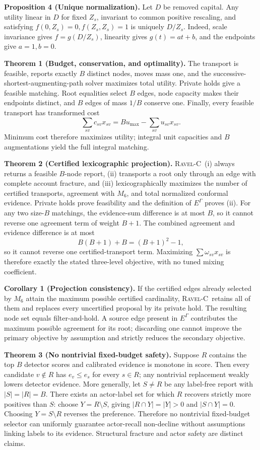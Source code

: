 \documentclass[runningheads]{llncs}
\newcommand{\ravelc}{\textsc{Ravel-C}}
\begin{document}
\textbf{Proposition 4 (Unique normalization).}
Let \(D\) be removed capital. Any utility linear in \(D\) for fixed \(Z_s\), invariant to common positive rescaling, and satisfying \(f(0,Z_s)=0,f(Z_s,Z_s)=1\) is uniquely \(D/Z_s\). Indeed, scale invariance gives \(f=g(D/Z_s)\), linearity gives \(g(t)=at+b\), and the endpoints give \(a=1,b=0\).

\textbf{Theorem 1 (Budget, conservation, and optimality).}
The transport is feasible, reports exactly \(B\) distinct nodes, moves mass one, and the successive-shortest-augmenting-path solver maximizes total utility. Private holds give a feasible matching. Root equalities select \(B\) edges, node capacity makes their endpoints distinct, and \(B\) edges of mass \(1/B\) conserve one. Finally, every feasible transport has transformed cost
\[
\sum_{sv}c_{sv}x_{sv}
=Bu_{\max}-\sum_{sv}u_{sv}x_{sv}.
\]
Minimum cost therefore maximizes utility; integral unit capacities and \(B\) augmentations yield the full integral matching.

\textbf{Theorem 2 (Certified lexicographic projection).}
\ravelc\ (i) always returns a feasible \(B\)-node report, (ii) transports a root only through an edge with complete account fracture, and (iii) lexicographically maximizes the number of certified transports, agreement with \(M_6\), and total normalized conformal evidence. Private holds prove feasibility and the definition of \(E^\Gamma\) proves (ii). For any two size-\(B\) matchings, the evidence-sum difference is at most \(B\), so it cannot reverse one agreement term of weight \(B+1\). The combined agreement and evidence difference is at most
\[
B(B+1)+B=(B+1)^2-1,
\]
so it cannot reverse one certified-transport term. Maximizing \(\sum\omega_{sv}x_{sv}\) is therefore exactly the stated three-level objective, with no tuned mixing coefficient.

\textbf{Corollary 1 (Projection consistency).}
If the certified edges already selected by \(M_6\) attain the maximum possible certified cardinality, \ravelc\ retains all of them and replaces every uncertified proposal by its private hold. The resulting node set equals filter-and-hold. A source edge present in \(E^\Gamma\) contributes the maximum possible agreement for its root; discarding one cannot improve the primary objective by assumption and strictly reduces the secondary objective.

\textbf{Theorem 3 (No nontrivial fixed-budget safety).}
Suppose \(R\) contains the top \(B\) detector scores and calibrated evidence is monotone in score. Then every candidate \(v\notin R\) has \(e_v\le e_s\) for every \(s\in R\); any nontrivial replacement weakly lowers detector evidence. More generally, let \(S\ne R\) be any label-free report with \(|S|=|R|=B\). There exists an actor-label set for which \(R\) recovers strictly more positives than \(S\): choose \(Y=R\setminus S\), giving \(|R\cap Y|=|Y|>0\) and \(|S\cap Y|=0\). Choosing \(Y=S\setminus R\) reverses the preference. Therefore no nontrivial fixed-budget selector can uniformly guarantee actor-recall non-decline without assumptions linking labels to its evidence. Structural fracture and actor safety are distinct claims.
\end{document}
